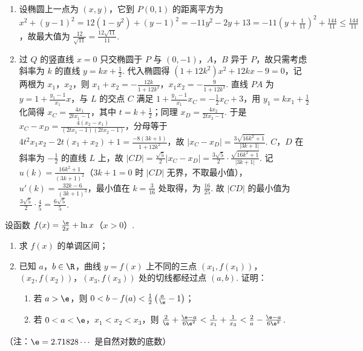 \begin{solution}
\begin{enumerate}
\item 设椭圆上一点为 \((x,y)\)，它到 \(P(0,1)\) 的距离平方为 \(x^2+(y-1)^2=12(1-y^2)+(y-1)^2=-11y^2-2y+13=-11\left(y+\frac1{11}\right)^2+\frac{144}{11}\le\frac{144}{11}\)，故最大值为 \(\frac{12}{\sqrt{11}}=\frac{12\sqrt{11}}{11}\).
\item 过 \(Q\) 的竖直线 \(x=0\) 只交椭圆于 \(P\) 与 \((0,-1)\)，\(A\)，\(B\) 异于 \(P\)，故只需考虑斜率为 \(k\) 的直线 \(y=kx+\frac12\). 代入椭圆得 \((1+12k^2)x^2+12kx-9=0\)，记两根为 \(x_1\)，\(x_2\)，则 \(x_1+x_2=-\frac{12k}{1+12k^2}\)，\(x_1x_2=-\frac9{1+12k^2}\). 直线 \(PA\) 为 \(y=1+\frac{y_1-1}{x_1}x\)，与 \(L\) 的交点 \(C\) 满足 \(1+\frac{y_1-1}{x_1}x_C=-\frac12x_C+3\)，用 \(y_1=kx_1+\frac12\) 化简得 \(x_C=\frac{4x_1}{2tx_1-1}\)，其中 \(t=k+\frac12\)；同理 \(x_D=\frac{4x_2}{2tx_2-1}\). 于是 \(x_C-x_D=\frac{4(x_2-x_1)}{(2tx_1-1)(2tx_2-1)}\)，分母等于 \(4t^2x_1x_2-2t(x_1+x_2)+1=\frac{-8(3k+1)}{1+12k^2}\)，故 \(|x_C-x_D|=\frac{3\sqrt{16k^2+1}}{|3k+1|}\). \(C\)，\(D\) 在斜率为 \(-\frac12\) 的直线 \(L\) 上，故 \(|CD|=\frac{\sqrt5}2|x_C-x_D|=\frac{3\sqrt5}2\cdot\frac{\sqrt{16k^2+1}}{|3k+1|}\). 记 \(u(k)=\frac{16k^2+1}{(3k+1)^2}\)（\(3k+1=0\) 时 \(|CD|\) 无界，不取最小值），\(u'(k)=\frac{32k-6}{(3k+1)^3}\)，最小值在 \(k=\frac3{16}\) 处取得，为 \(\frac{16}{25}\). 故 \(|CD|\) 的最小值为 \(\frac{3\sqrt5}2\cdot\frac45=\frac{6\sqrt5}5\).
\end{enumerate}
\end{solution}

\begin{problem}
设函数 \(f(x)=\frac{\e}{2x}+\ln x\)（\(x>0\)）.

\begin{enumerate}
\item 求 \(f(x)\) 的单调区间；

\item 已知 \(a\)，\(b\in\R\)，曲线 \(y=f(x)\) 上不同的三点 \((x_1,f(x_1))\)，\((x_2,f(x_2))\)，\((x_3,f(x_3))\) 处的切线都经过点 \((a,b)\). 证明：

\begin{enumerate}
\item 若 \(a>\e\)，则 \(0<b-f(a)<\frac12\left(\frac{a}{\e}-1\right)\)；

\item 若 \(0<a<\e\)，\(x_1<x_2<x_3\)，则 \(\frac{2}{\e}+\frac{\e-a}{6\e^2}<\frac1{x_1}+\frac1{x_3}<\frac2a-\frac{\e-a}{6\e^2}\).
\end{enumerate}
\end{enumerate}

（注：\(\e=2.71828\cdots\) 是自然对数的底数）
\end{problem}

